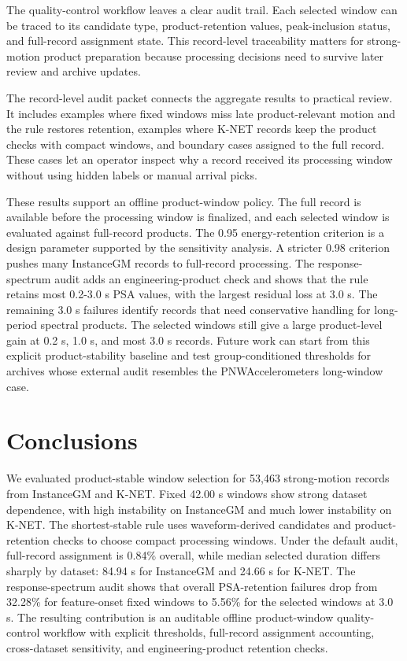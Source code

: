\documentclass[12pt,letterpaper]{article}
\begin{document}
The quality-control workflow leaves a clear audit trail. Each selected window can be traced to its candidate type, product-retention values, peak-inclusion status, and full-record assignment state. This record-level traceability matters for strong-motion product preparation because processing decisions need to survive later review and archive updates.

The record-level audit packet connects the aggregate results to practical review. It includes examples where fixed windows miss late product-relevant motion and the rule restores retention, examples where K-NET records keep the product checks with compact windows, and boundary cases assigned to the full record. These cases let an operator inspect why a record received its processing window without using hidden labels or manual arrival picks.

These results support an offline product-window policy. The full record is available before the processing window is finalized, and each selected window is evaluated against full-record products. The 0.95 energy-retention criterion is a design parameter supported by the sensitivity analysis. A stricter 0.98 criterion pushes many InstanceGM records to full-record processing. The response-spectrum audit adds an engineering-product check and shows that the rule retains most 0.2-3.0 s PSA values, with the largest residual loss at 3.0 s. The remaining 3.0 s failures identify records that need conservative handling for long-period spectral products. The selected windows still give a large product-level gain at 0.2 s, 1.0 s, and most 3.0 s records. Future work can start from this explicit product-stability baseline and test group-conditioned thresholds for archives whose external audit resembles the PNWAccelerometers long-window case.

\section{Conclusions}\label{conclusions}

We evaluated product-stable window selection for 53,463 strong-motion records from InstanceGM and K-NET. Fixed 42.00 s windows show strong dataset dependence, with high instability on InstanceGM and much lower instability on K-NET. The shortest-stable rule uses waveform-derived candidates and product-retention checks to choose compact processing windows. Under the default audit, full-record assignment is 0.84\% overall, while median selected duration differs sharply by dataset: 84.94 s for InstanceGM and 24.66 s for K-NET. The response-spectrum audit shows that overall PSA-retention failures drop from 32.28\% for feature-onset fixed windows to 5.56\% for the selected windows at 3.0 s. The resulting contribution is an auditable offline product-window quality-control workflow with explicit thresholds, full-record assignment accounting, cross-dataset sensitivity, and engineering-product retention checks.
\end{document}
